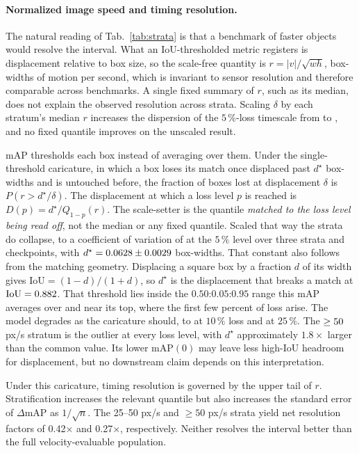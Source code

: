 \documentclass[10pt,twocolumn,letterpaper]{article}
\begin{document}
\paragraph{Normalized image speed and timing resolution.} The natural reading of
Tab.~\ref{tab:strata} is that a benchmark of faster objects would resolve the interval. What an
IoU-thresholded metric registers is displacement relative to box size, so the scale-free
quantity is $r = |v| / \sqrt{wh}$, box-widths of motion per second, which is invariant to
sensor resolution and therefore comparable across benchmarks. A single fixed summary of $r$,
such as its median, does not explain the observed resolution across strata. Scaling $\delta$ by
each stratum's median $r$ increases the dispersion of the $5\,\%$-loss timescale from
\collapseCVraw{} to \collapseCVmed{}, and no fixed quantile improves on the unscaled result.

mAP thresholds each box instead of averaging over them. Under the single-threshold
caricature, in which a box loses its match once displaced past $d^{\star}$ box-widths and is
untouched before, the fraction of boxes lost at displacement $\delta$ is
$P(r > d^{\star}/\delta)$. The displacement at which a loss level $p$ is reached is
$D(p) = d^{\star} / Q_{1-p}(r)$. The scale-setter is the quantile \emph{matched to the loss
level being read off}, not the median or any fixed quantile. Scaled that way the strata
do collapse, to a coefficient of variation of \collapseCV{} at the $5\,\%$ level over three
strata and \rankCkpts{} checkpoints, with $d^{\star} = 0.0628 \pm 0.0029$
box-widths. That constant also follows from the matching geometry. Displacing a square box by a
fraction $d$ of its width gives $\mathrm{IoU} = (1-d)/(1+d)$, so $d^{\star}$ is the
displacement that breaks a match at $\mathrm{IoU} = 0.882$. That threshold lies inside the
$0.50$:$0.05$:$0.95$ range this mAP averages over and near its top, where the first few
percent of loss arise. The model degrades as the caricature should, to \collapseCVten{}
at $10\,\%$ loss and \collapseCVqtr{} at $25\,\%$. The $\geq50\,$px/s stratum is the
outlier at every loss level, with $d^{\star}$ approximately $1.8\times$ larger than the common
value. Its lower mAP$(0)$ may leave less high-IoU headroom for displacement, but no downstream
claim depends on this interpretation.

Under this caricature, timing resolution is governed by the upper tail of $r$. Stratification
increases the relevant quantile but also increases the standard error of $\Delta$mAP as
$1/\sqrt{n}$. The 25--50 px/s and $\geq 50$ px/s strata yield net resolution factors of
0.42$\times$ and 0.27$\times$, respectively. Neither resolves the interval better than the
full velocity-evaluable population.
\end{document}
